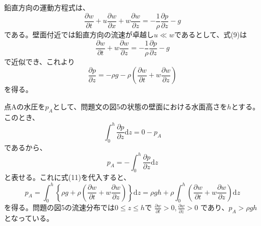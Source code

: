 \documentclass[a4paper]{jsarticle}
\begin{document}
\subsection{}
鉛直方向の運動方程式は、
\begin{equation}
  \frac{\partial w}{\partial t}
  + u \frac{\partial w}{\partial x}
  + w \frac{\partial w}{\partial z}
  = - \frac{1}{\rho} \frac{\partial p}{\partial z} - g
\end{equation}
である。壁面付近では鉛直方向の流速が卓越し$u \ll w$であるとして、式(9)は
\begin{equation}
  \frac{\partial w}{\partial t}
  + w \frac{\partial w}{\partial z}
  = - \frac{1}{\rho} \frac{\partial p}{\partial z} - g
\end{equation}
で近似でき、これより
\begin{equation}
  \frac{\partial p}{\partial z} = -\rho g
  - \rho \left(\frac{\partial w}{\partial t}
  + w \frac{\partial w}{\partial z}\right)
\end{equation}
を得る。\par
点Aの水圧を$p_A$として、問題文の図5の状態の壁面における水面高さを$h$とする。
このとき、
\begin{equation}
  \int_0^h \frac{\partial p}{\partial z} \mathrm{d} z = 0 - p_A
\end{equation}
であるから、
\begin{equation}
  p_A = -\int_0^h \frac{\partial p}{\partial z} \mathrm{d} z
\end{equation}
と表せる。これに式(11)を代入すると、
\begin{equation}
  p_A = \int_0^h \left\{\rho g
  + \rho \left(\frac{\partial w}{\partial t}
  + w \frac{\partial w}{\partial z}\right)\right\} \mathrm{d} z
  = \rho g h + \rho \int_0^h
  \left(\frac{\partial w}{\partial t}
  + w \frac{\partial w}{\partial z}\right) \mathrm{d} z
\end{equation}
を得る。問題の図5の流速分布では$0 \leq z \leq h$で
$\frac{\partial w}{\partial t} > 0, \frac{\partial w}{\partial z} > 0$
であり、$p_A > \rho g h$となっている。
\end{document}
